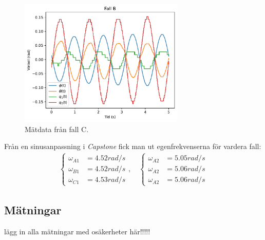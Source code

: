 \begin{figure}[htbp]
    \centering
    \includegraphics[width=0.7\textwidth]{plot_B.pdf}
    \caption{Mätdata från fall C.}
    \label{fig:C}
\end{figure}

Från en sinusanpassning i \emph{Capstone} fick man ut egenfrekvenserna för vardera fall:
\begin{align}
    \begin{cases}
        \omega_{A1} &= 4.52\unit{rad/s}\\
        \omega_{B1} &= 4.52\unit{rad/s}\\
        \omega_{C1} &= 4.53\unit{rad/s}
    \end{cases},\quad 
    \begin{cases}
        \omega_{A2} &= 5.05\unit{rad/s}\\
        \omega_{A2} &= 5.06\unit{rad/s}\\
        \omega_{A2} &= 5.06\unit{rad/s}
    \end{cases} \label{eq: omega cap}
\end{align}

\subsection{Mätningar}
lägg in alla mätningar med osäkerheter här!!!!!